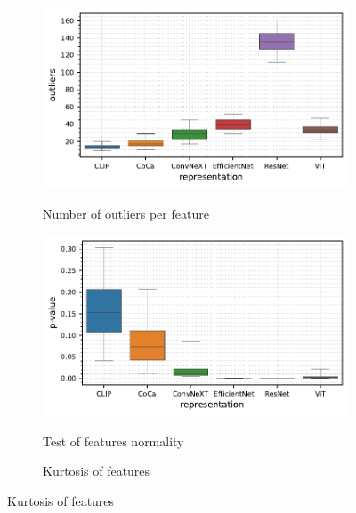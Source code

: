 \begin{figure}[t]
\begin{subfigure}[b]{0.495\textwidth}
        \centering
        \caption{\small Number of outliers per feature}
        \includegraphics[width=\textwidth]{images/real-characteristics/image/properties-ImageNet-noutliers(representation,representation)-representation_CLIP,CoCa,ConvNeXT,EfficientNet,ResNet,ViT-class_0,999-data_ID-train.pdf}
        \label{fig:image-outliers}
    \end{subfigure}
    \hfill
    \begin{subfigure}[b]{0.495\textwidth}
        \centering
        \caption{\small Test of features normality}
        \includegraphics[width=\textwidth]{images/real-characteristics/image/properties-ImageNet-pval(representation,representation)-representation_CLIP,CoCa,ConvNeXT,EfficientNet,ResNet,ViT-class_0,999-data_ID-train.pdf}
        \label{fig:image-pvalue}
    \end{subfigure}
    \begin{subfigure}[b]{0.495\textwidth}
        \centering
        \caption{\small Kurtosis of features}

\end{subfigure}
\end{figure}
